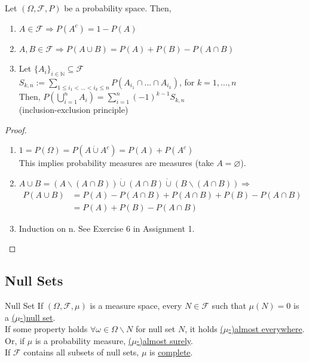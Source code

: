 \documentclass{article}
\begin{document}
	\begin{myprop}{}{}
		Let $(\Omega, \mathcal{F}, P)$ be a probability space. Then,
		\begin{enumerate}
			\item $A\in\mathcal{F}\Rightarrow P(A^c)=1-P(A)$
			\item $A, B\in\mathcal{F}\Rightarrow P(A\cup B)=P(A)+P(B)-P(A\cap B)$
			\item Let $\{A_i\}_{i\in\mathbb{N}}\subseteq\mathcal{F}$\\
			$S_{k, n}:=\sum_{1\leq i_1<...<i_k\leq n}P(A_{i_1}\cap...\cap A_{i_k})$, for $k=1,...,n$\\
			
			Then, $P(\bigcup_{i=1}^{n}A_i)=\sum_{i=1}^{n}(-1)^{k-1}S_{k, n}$\\
			
			(inclusion-exclusion principle)
		\end{enumerate}
		
		\begin{proof}~\\
		\begin{enumerate}
			\item $1=P(\Omega)=P(A\dot\cup A^c)=P(A)+P(A^c)$\\
			
			This implies probability measures are measures (take $A=\varnothing$).
			\item $A\cup B=(A\backslash(A\cap B))\dot\cup(A\cap B)\dot\cup(B\backslash(A\cap B))\Rightarrow$
			\begin{align*}
				P(A\cup B)&=P(A)-P(A\cap B)+P(A\cap B)+P(B)-P(A\cap B)\\
				&=P(A)+P(B)-P(A\cap B)
			\end{align*}
			\item Induction on n. See Exercise 6 in Assignment 1.
		\end{enumerate}
	\end{proof}
	\end{myprop}
	
	\newpage\subsection{Null Sets}	
	
	\begin{mydef}{Null Set}{}
		If $(\Omega, \mathcal{F}, \mu)$ is a measure space, every $N\in\mathcal{F}$ such that $\mu(N)=0$ is a \underline{($\mu$-)null set}.\\
		
		If some property holds $\forall\omega\in\Omega\backslash N$ for null set $N$, it holds \underline{($\mu$-)almost everywhere}.\\
		
		Or, if $\mu$ is a probability measure, \underline{($\mu$-)almost surely}.\\
		
		If $\mathcal{F}$ contains all subsets of null sets, $\mu$ is \underline{complete}.
	\end{mydef}
	
\end{document}
